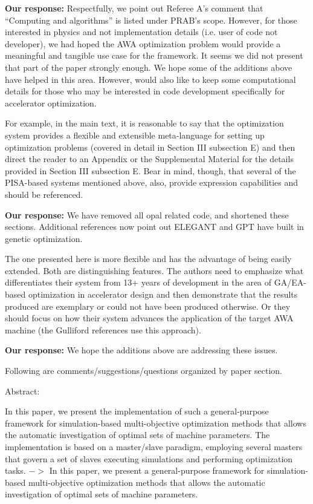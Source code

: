 \documentclass{article}
\begin{document}
{\bf Our response:} {\color{blue} 
	Respectfully, we point out Referee A's comment that 
	``Computing and algorithms'' is listed under PRAB's scope. 
	However, for those interested in physics and not implementation details (i.e. user of code not developer), 
	we had hoped the AWA optimization problem would 
	provide a meaningful and tangible use case for the framework.
	It seems we did not present that part of the paper strongly enough. 
	We hope some of the additions above have helped in this area.
	However, would also like to keep some computational details for those who 
	may be interested in code development specifically for accelerator optimization.
}


For example, in the main text, it is
reasonable to say that the optimization system provides a flexible and
extensible meta-language for setting up optimization problems (covered
in detail in Section III subsection E) and then direct the reader to
an Appendix or the Supplemental Material for the details provided in
Section III subsection E. Bear in mind, though, that several of the
PISA-based systems mentioned above, also, provide expression
capabilities and should be referenced. 

{\bf Our response: }{\color{blue} We have removed all opal related code, and shortened these sections.
	Additional references now point out ELEGANT and GPT have built in genetic optimization.}

The one presented here is more
flexible and has the advantage of being easily extended. Both are
distinguishing features. The authors need to emphasize what
differentiates their system from 13+ years of development in the area
of GA/EA-based optimization in accelerator design and then demonstrate
that the results produced are exemplary or could not have been
produced otherwise. Or they should focus on how their system advances
the application of the target AWA machine (the Gulliford references
use this approach).

{\bf Our response: }{\color{blue} 	
	We hope the additions above are addressing these issues. }

Following are comments/suggestions/questions organized by paper
section.

Abstract:

In this paper, we present the implementation of such a general-purpose
framework for simulation-based multi-objective optimization methods
that allows the automatic investigation of optimal sets of machine
parameters. The implementation is based on a master/slave paradigm,
employing several masters that govern a set of slaves executing
simulations and performing optimization tasks. $->$ In this paper, we
present a general-purpose framework for simulation-based
multi-objective optimization methods that allows the automatic
investigation of optimal sets of machine parameters.
\end{document}
